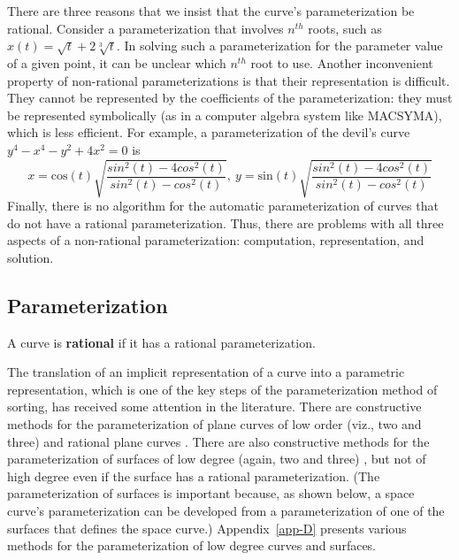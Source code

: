 There are three reasons that we insist that the curve's 
parameterization be rational.
Consider a parameterization that involves $n^{th}$ roots,
such as \mbox{$x(t) = \sqrt{t} + 2 \sqrt[3]{t}$}.
In solving such a parameterization for the parameter value of a
given point, it can be unclear which $n^{th}$ root to use.
Another inconvenient property of non-rational parameterizations is
that their representation is difficult.
They cannot be represented by the coefficients of the parameterization:
they must be represented symbolically (as in a computer algebra system like
MACSYMA), which is less efficient.
For example,
a parameterization of the devil's curve
$y^{4} - x^{4} - y^{2} + 4x^{2} = 0$ is 
\[ x = \mbox{cos}(t)\sqrt{\frac{sin^{2}(t)-4cos^{2}(t)}{sin^{2}(t) - cos^{2}(t)}},
\ y=\mbox{sin}(t)\sqrt{\frac{sin^{2}(t)-4cos^{2}(t)}{sin^{2}(t) - cos^{2}(t)}}\]
%
Finally, there is no algorithm for the automatic parameterization
of curves that do not have a rational parameterization.
Thus, there are problems with all three aspects of a non-rational
parameterization: computation, representation, and solution.
%
\subsection{Parameterization}
\label{subsec-par}

%
\begin{definition}
A curve is {\bf rational} if it has a rational parameterization.
\end{definition}

The translation of an implicit representation of a curve into a parametric
representation, which is one of the key steps of the parameterization method
of sorting, has received some attention in the literature.
There are constructive methods for the parameterization of plane curves of low
order (viz., two and three) \cite{abba1,abba2,hopcroft-hoffmann}
and rational plane curves \cite{abba3}.
There are also constructive methods for the parameterization of surfaces
of low degree (again, two and three) \cite{abba1,abba2,levin76}, but not 
of high degree even if the surface has a rational parameterization.
(The parameterization of surfaces is important because, as shown below,
a space curve's parameterization can be developed from 
a parameterization of one of the surfaces that defines the space curve.)
Appendix~\ref{app-D} presents various 
methods for the parameterization of low degree
curves and surfaces.

